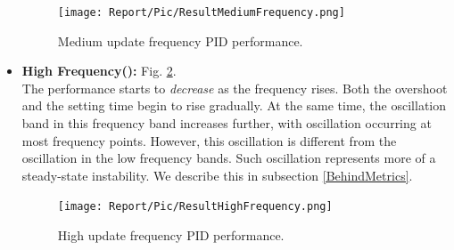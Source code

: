 \documentclass[conference]{IEEEtran}
\begin{document}
\begin{itemize}
        \begin{figure}
            \centering
            \texttt{[image: Report/Pic/ResultMediumFrequency.png]}
            \caption{Medium update frequency PID performance.}
            \label{fig_MediumFrequency}
        \end{figure}
    \item \textbf{High Frequency():} Fig. \ref{fig_HighFrequency}.
    \\
    The performance starts to \textit{decrease} as the frequency rises. Both the overshoot and the setting time begin to rise gradually. At the same time, the oscillation band in this frequency band increases further, with oscillation occurring at most frequency points. However, this oscillation is different from the oscillation in the low frequency bands. Such oscillation represents more of a steady-state instability. We describe this in subsection \ref{BehindMetrics}.
        \begin{figure}
            \centering
            \texttt{[image: Report/Pic/ResultHighFrequency.png]}
            \caption{High update frequency PID performance.}
            \label{fig_HighFrequency}
        \end{figure}
\end{itemize}
\end{document}
